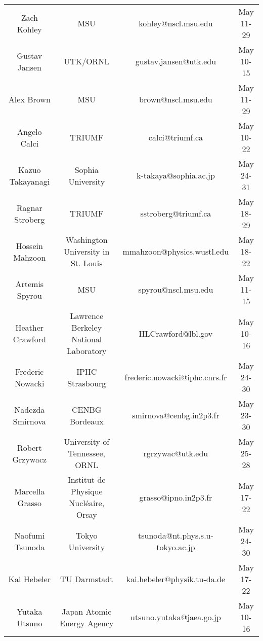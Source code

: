 \documentclass{beamer}
\begin{document}
\begin{frame}
\begin{block}{}
{\begin{tabular}{cccc}
Zach Kohley          & MSU                                    & kohley@nscl.msu.edu                & May 11-29            \\
Gustav Jansen        & UTK/ORNL                               & gustav.jansen@utk.edu              & May 10-15            \\
Alex Brown           & MSU                                    & brown@nscl.msu.edu                 & May 11-29            \\
Angelo Calci         & TRIUMF                                 & calci@triumf.ca                    & May 10-22            \\
Kazuo Takayanagi     & Sophia University                      & k-takaya@sophia.ac.jp              & May 24-31            \\
Ragnar Stroberg      & TRIUMF                                 & sstroberg@triumf.ca                & May 18-29            \\
Hossein Mahzoon      & Washington University in St. Louis     & mmahzoon@physics.wustl.edu         & May 18-22            \\
Artemis Spyrou       & MSU                                    & spyrou@nscl.msu.edu                & May 11-15            \\
Heather Crawford     & Lawrence Berkeley National Laboratory  & HLCrawford@lbl.gov                 & May 10-16            \\
Frederic Nowacki     & IPHC Strasbourg                        & frederic.nowacki@iphc.cnrs.fr      & May 24-30            \\
Nadezda Smirnova     & CENBG Bordeaux                         & smirnova@cenbg.in2p3.fr            & May 23-30            \\
Robert	Grzywacz      & University of Tennessee, ORNL          & rgrzywac@utk.edu                   & May 25-28            \\
Marcella Grasso      & Institut de Physique Nucléaire, Orsay & grasso@ipno.in2p3.fr               & May 17-22            \\
Naofumi Tsunoda      & Tokyo University                       & tsunoda@nt.phys.s.u-tokyo.ac.jp    & May 24-30            \\
Kai Hebeler          & TU Darmstadt                           & kai.hebeler@physik.tu-da.de        & May 17-22            \\
Yutaka Utsuno        & Japan Atomic Energy Agency             & utsuno.yutaka@jaea.go.jp           & May 10-16            \\

\end{tabular}}
\end{block}
\end{frame}
\end{document}

